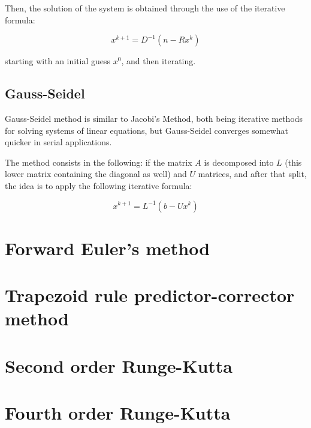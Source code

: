 \documentclass[paper=a4, fontsize=11pt]{scrartcl} %
\numberwithin{equation}{section} %
\numberwithin{figure}{section} %
\numberwithin{table}{section} %
\begin{document}
Then, the solution of the system is obtained through the use of the iterative formula:

\begin{equation}
x^{k+1} = D^{-1}(n-Rx^{k})
\end{equation}

starting with an initial guess $x^{0}$, and then iterating.

\subsection{Gauss-Seidel}

Gauss-Seidel method is similar to Jacobi's Method, both being iterative methods for solving systems of linear equations, but Gauss-Seidel converges somewhat quicker in serial applications.

The method consists in the following: if the matrix $A$ is decomposed into $L$ (this lower matrix containing the diagonal as well) and $U$ matrices, and after that split, the idea is to apply the following iterative formula:

\begin{equation}
x^{k+1} = L^{-1}(b-Ux^{k})
\end{equation}


\section{Forward Euler's method}



\section{Trapezoid rule predictor-corrector method}



\section{Second order Runge-Kutta}



\section{Fourth order Runge-Kutta}
\end{document}
